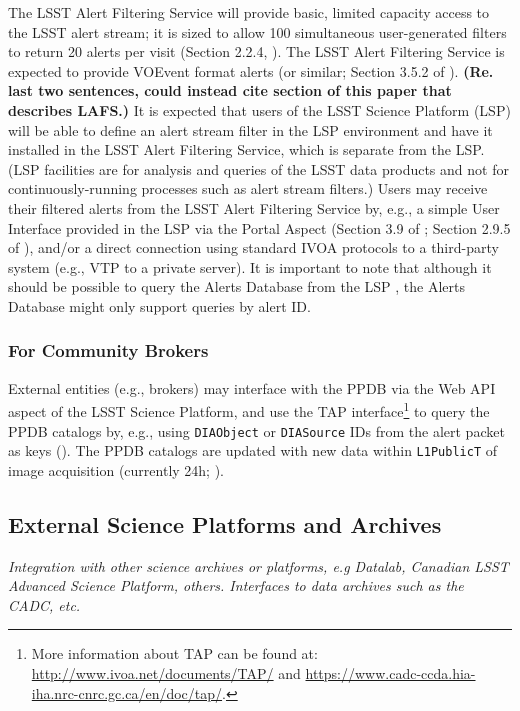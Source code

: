 The LSST Alert Filtering Service will provide basic, limited capacity access to the LSST alert stream; it is sized to allow 100 simultaneous user-generated filters to return 20 alerts per visit (Section 2.2.4, \citealt{LSE-61}). The LSST Alert Filtering Service is expected to provide VOEvent format alerts (or similar; Section 3.5.2 of \citealt{LSE-163}). {\bf (Re. last two sentences, could instead cite section of this paper that describes LAFS.)} It is expected that users of the LSST Science Platform (LSP) will be able to define an alert stream filter in the LSP environment and have it installed in the LSST Alert Filtering Service, which is separate from the LSP. (LSP facilities are for analysis and queries of the LSST data products and not for continuously-running processes such as alert stream filters.)  Users may receive their filtered alerts from the LSST Alert Filtering Service by, e.g., a simple User Interface provided in the LSP via the Portal Aspect (Section 3.9 of \citealt{LDM-542}; Section 2.9.5 of \citealt{LDM-554}), and/or a direct connection using standard IVOA protocols to a third-party system (e.g., VTP to a private server). It is important to note that although it should be possible to query the Alerts Database from the LSP \citep{LDM-542}, the Alerts Database might only support queries by alert ID. 

\subsubsection{For Community Brokers}\label{sssec:interfaces_lsp_brokers}

External entities (e.g., brokers) may interface with the PPDB via the Web API aspect of the LSST Science Platform, and use the TAP interface\footnote{More information about TAP can be found at:
\url{http://www.ivoa.net/documents/TAP/} and \url{https://www.cadc-ccda.hia-iha.nrc-cnrc.gc.ca/en/doc/tap/}.} to query the PPDB catalogs by, e.g., using {\tt DIAObject} or {\tt DIASource} IDs from the alert packet as keys (\citealt{LSE-319,LDM-542,LDM-554}). The PPDB catalogs are updated with new data within {\tt L1PublicT} of image acquisition (currently 24h; \citealt{LSE-29}). 



\subsection{External Science Platforms and Archives}\label{ssec:interfaces_other}
{\it Integration with other science archives or platforms, e.g Datalab, Canadian LSST Advanced Science Platform, others. Interfaces to data archives such as the CADC, etc.}

